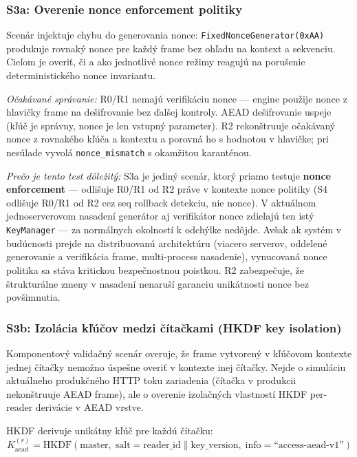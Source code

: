 \subsubsection{S3a: Overenie nonce enforcement politiky}

Scenár injektuje chybu do generovania nonce: \texttt{FixedNonceGenerator(0xAA)} produkuje rovnaký nonce pre každý frame bez ohľadu na kontext a sekvenciu. Cieľom je overiť, či a ako jednotlivé nonce režimy reagujú na porušenie deterministického nonce invariantu.

\textit{Očakávané správanie:} R0/R1 nemajú verifikáciu nonce --- engine použije nonce z hlavičky frame na dešifrovanie bez ďalšej kontroly. AEAD dešifrovanie uspeje (kľúč je správny, nonce je len vstupný parameter). R2 rekonštruuje očakávaný nonce z rovnakého kľúča a kontextu a porovná ho s hodnotou v hlavičke; pri nesúlade vyvolá \texttt{nonce\_mismatch} s okamžitou karanténou.

\textit{Prečo je tento test dôležitý:} S3a je jediný scenár, ktorý priamo testuje \textbf{nonce enforcement} --- odlišuje R0/R1 od R2 práve v kontexte nonce politiky (S4 odlišuje R0/R1 od R2 cez seq rollback detekciu, nie nonce). V aktuálnom jednoserverovom nasadení generátor aj verifikátor nonce zdieľajú ten istý \texttt{KeyManager} --- za normálnych okolností k odchýlke nedôjde. Avšak ak systém v budúcnosti prejde na distribuovanú architektúru (viacero serverov, oddelené generovanie a verifikácia frame, multi-process nasadenie), vynucovaná nonce politika sa stáva kritickou bezpečnostnou poistkou. R2 zabezpečuje, že štrukturálne zmeny v nasadení nenaruší garanciu unikátnosti nonce bez povšimnutia\cite{RogawayNonceMisuse2004}.

\subsubsection{S3b: Izolácia kľúčov medzi čítačkami (HKDF key isolation)}

Komponentový validačný scenár overuje, že frame vytvorený v kľúčovom kontexte jednej čítačky nemožno úspešne overiť v kontexte inej čítačky. Nejde o simuláciu aktuálneho produkčného HTTP toku zariadenia (čítačka v produkcii nekonštruuje AEAD frame), ale o overenie izolačných vlastností HKDF per-reader derivácie v AEAD vrstve.

HKDF\cite{RFC5869} derivuje unikátny kľúč pre každú čítačku:
\begin{equation}
K_{\text{aead}}^{(r)} = \text{HKDF}(\text{master}, \; \text{salt}=\text{reader\_id} \| \text{key\_version}, \; \text{info}=\text{``access-aead-v1''})
\end{equation}

